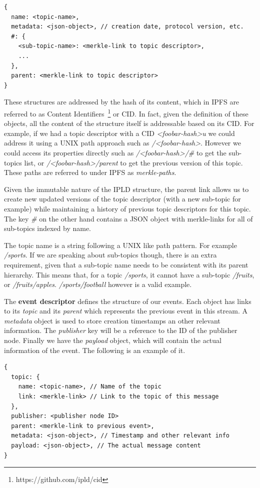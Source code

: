 \begin{verbatim}
{
  name: <topic-name>,
  metadata: <json-object>, // creation date, protocol version, etc.
  #: {
    <sub-topic-name>: <merkle-link to topic descriptor>,
    ...
  },
  parent: <merkle-link to topic descriptor>
}
\end{verbatim}

These structures are addressed by the hash of its content, which in IPFS
are referred to as Content Identifiers~\footnote{https://github.com/ipld/cid} or CID. In
fact, given the definition of these objects, all the content of the
structure itself is addressable based on its CID. For example, if we had
a topic descriptor with a CID
\emph{<foobar-hash>u} we could
address it using a UNIX path approach such as
\emph{/<foobar-hash>}. However we
could access its properties directly such as
\emph{/<foobar-hash>/\#} to get the
sub-topics list, or
\emph{/<foobar-hash>/parent} to get
the previous version of this topic. These paths are referred to under
IPFS as \emph{merkle-paths}.

Given the immutable nature of the IPLD structure, the parent link allows
us to create new updated versions of the topic descriptor (with a new
sub-topic for example) while maintaining a history of previous topic
descriptors for this topic. The key \emph{\#} on the other hand
contains a JSON object with merkle-links for all of sub-topics indexed
by name.

The topic name is a string following a UNIX like path pattern. For
example \emph{/sports}. If we are speaking about sub-topics though,
there is an extra requirement, given that a sub-topic name needs to be
consistent with its parent hierarchy. This means that, for a topic
\emph{/sports}, it cannot have a sub-topic \emph{/fruits}, or
\emph{/fruits/apples}. \emph{/sports/football} however is a valid
example.

The \textbf{event descriptor} defines the structure of our events. Each
object has links to its \emph{topic} and its \emph{parent} which
represents the previous event in this stream. A \emph{metadata} object
is used to store creation timestamps an other relevant information. The
\emph{publisher} key will be a reference to the ID of the publisher
node. Finally we have the \emph{payload} object, which will contain the
actual information of the event. The following is an example of it.

\begin{verbatim}
{
  topic: {
    name: <topic-name>, // Name of the topic
    link: <merkle-link> // Link to the topic of this message
  },
  publisher: <publisher node ID>
  parent: <merkle-link to previous event>,
  metadata: <json-object>, // Timestamp and other relevant info
  payload: <json-object>, // The actual message content
}
\end{verbatim}

